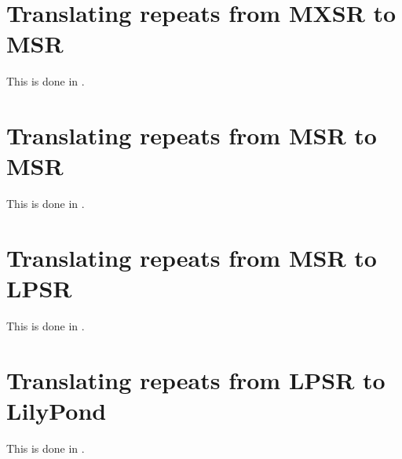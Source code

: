 \section{Translating repeats from MXSR to MSR}

This is done in \mxsrToMsr{}.


\section{Translating repeats from MSR to MSR}

This is done in \msrToMsr{}.


\section{Translating repeats from MSR to LPSR}

This is done in \msrToLpsr{}.


\section{Translating repeats from LPSR to LilyPond}

This is done in \lpsrToLilypond{}.


